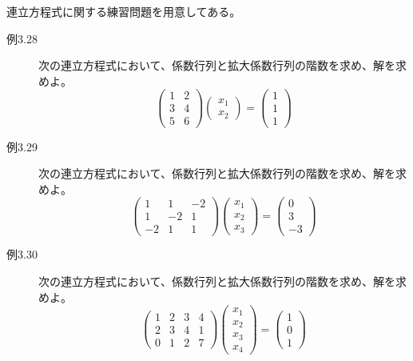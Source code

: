 \documentclass[10pt]{jsreport}
\theoremstyle{definition}%
\numberwithin{equation}{section}%
\begin{document}
連立方程式に関する練習問題を用意してある。
\begin{description}
  \item[例3.28] 次の連立方程式において、係数行列と拡大係数行列の階数を求め、解を求めよ。  
  \begin{equation}
    \begin{pmatrix}
      1 & 2\\
      3 & 4\\
      5 & 6
    \end{pmatrix}
    \begin{pmatrix}
    x_{1}\\
    x_{2}  
    \end{pmatrix}=\begin{pmatrix}
      1\\
      1\\
      1
    \end{pmatrix}
  \end{equation}
  \item[例3.29] 次の連立方程式において、係数行列と拡大係数行列の階数を求め、解を求めよ。  
  \begin{equation}
    \begin{pmatrix}
      1 & 1 & -2 \\
      1 & -2 & 1 \\
      -2 & 1 & 1
    \end{pmatrix}
    \begin{pmatrix}
    x_{1}\\
    x_{2}\\
    x_{3}
    \end{pmatrix}=\begin{pmatrix}
      0\\
      3\\
      -3
    \end{pmatrix}
  \end{equation} 
  \item[例3.30] 次の連立方程式において、係数行列と拡大係数行列の階数を求め、解を求めよ。  
  \begin{equation}
    \begin{pmatrix}
      1 & 2 & 3 & 4  \\
      2 & 3 & 4 & 1 \\
      0 & 1 & 2 & 7
    \end{pmatrix}
    \begin{pmatrix}
    x_{1}\\
    x_{2}\\
    x_{3}\\
    x_{4}
    \end{pmatrix}=\begin{pmatrix}
      1\\
      0\\
      1
    \end{pmatrix}
  \end{equation} 
\end{description}
\end{document}
